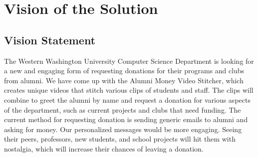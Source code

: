 \section{Vision of the Solution}
    
\subsection{Vision Statement}
%
The Western Washington University Computer Science Department
is looking for a new and engaging form of requesting donations for their programs and clubs from alumni.
We have come up with the Alumni Money Video Stitcher,
which creates unique videos that stitch various clips of students and staff. The clips will combine to 
greet the alumni by name and request a donation for various aspects of the department, such as 
current projects and clubs that need funding.
The current method for requesting donation is sending generic emails to alumni and asking for money. 
Our personalized messages would be more engaging. Seeing their peers, professors, new students, and school projects will hit them with nostalgia, 
which will increase their chances of leaving a donation.
  
